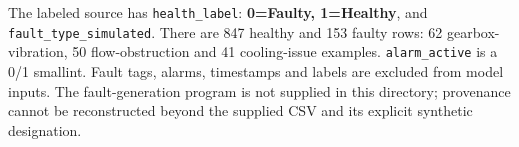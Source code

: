 The labeled source has \texttt{health\_label}: \textbf{0=Faulty, 1=Healthy}, and \texttt{fault\_type\_simulated}. There are 847 healthy and 153 faulty rows: 62 gearbox-vibration, 50 flow-obstruction and 41 cooling-issue examples. \texttt{alarm\_active} is a 0/1 smallint. Fault tags, alarms, timestamps and labels are excluded from model inputs. The fault-generation program is not supplied in this directory; provenance cannot be reconstructed beyond the supplied CSV and its explicit synthetic designation.
